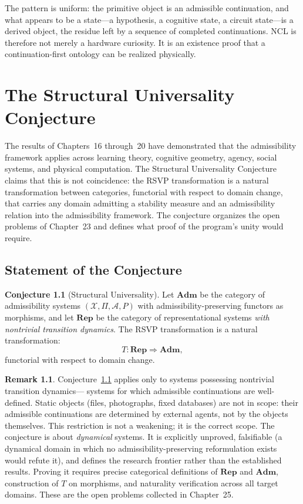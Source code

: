 \documentclass[12pt, oneside]{book}
\theoremstyle{flyxion}
\theoremstyle{definition}
\newtheorem{conjecture}[theorem]{Conjecture}
\newtheorem{remark}[theorem]{Remark}
\begin{document}
The pattern is uniform: the primitive object is an
admissible continuation, and what appears to be a
state---a hypothesis, a cognitive state, a circuit
state---is a derived object, the residue left by
a sequence of completed continuations. NCL is
therefore not merely a hardware curiosity. It is
an existence proof that a continuation-first ontology
can be realized physically.

\chapter{The Structural Universality Conjecture}

The results of Chapters~16 through~20 have demonstrated
that the admissibility framework applies across learning
theory, cognitive geometry, agency, social systems, and
physical computation. The Structural Universality
Conjecture claims that this is not coincidence: the
RSVP transformation is a natural transformation between
categories, functorial with respect to domain change,
that carries any domain admitting a stability measure
and an admissibility relation into the admissibility
framework. The conjecture organizes the open problems
of Chapter~23 and defines what proof of the program's
unity would require.

\section{Statement of the Conjecture}

\begin{conjecture}[Structural Universality]
\label{conj:universality}
Let $\mathbf{Adm}$ be the category of admissibility
systems $(\mathcal{X}, \Pi, \mathcal{A}, P)$ with
admissibility-preserving functors as morphisms, and
let $\mathbf{Rep}$ be the category of representational
systems \emph{with nontrivial transition dynamics}. The
RSVP transformation is a natural transformation:
\[
T : \mathbf{Rep} \Rightarrow \mathbf{Adm},
\]
functorial with respect to domain change.
\end{conjecture}

\begin{remark}
Conjecture~\ref{conj:universality} applies only to
systems possessing nontrivial transition dynamics---
systems for which admissible continuations are
well-defined. Static objects (files, photographs,
fixed databases) are not in scope: their admissible
continuations are determined by external agents, not
by the objects themselves. This restriction is not a
weakening; it is the correct scope. The conjecture
is about \emph{dynamical} systems. It is explicitly
unproved, falsifiable (a dynamical domain in which no
admissibility-preserving reformulation exists would
refute it), and defines the research frontier rather
than the established results. Proving it requires
precise categorical definitions of $\mathbf{Rep}$
and $\mathbf{Adm}$, construction of $T$ on morphisms,
and naturality verification across all target domains.
These are the open problems collected in Chapter~25.
\end{remark}
\end{document}
